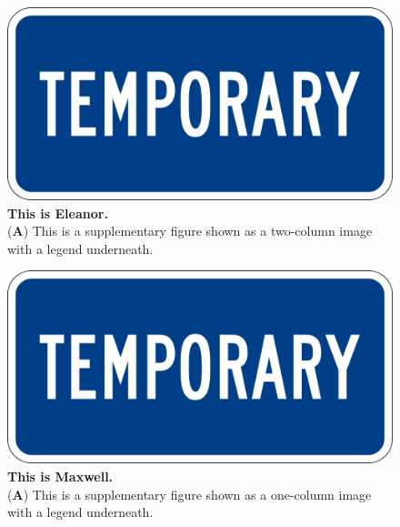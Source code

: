 \documentclass[vruler,JCS]{COB}
\begin{document}


\newcommand{\newblock}{}




\clearpage

\setcounter{figure}{0} %
\makeatletter 
\renewcommand{\thefigure}{S\@arabic\c@figure} %
\makeatother


\begin{figure}
\centering
\includegraphics[width=0.75\linewidth]{Figures/temp.png}
\caption{\textbf{This is Eleanor.}\\
(\textbf{A}) This is a supplementary figure shown as a two-column image with a legend underneath.}
\label{suppfig:eleanor}
\end{figure}

\begin{figure}
\centering
\includegraphics[width=0.75\linewidth]{Figures/temp.png}
\caption{\textbf{This is Maxwell.}\\
(\textbf{A}) This is a supplementary figure shown as a one-column image with a legend underneath.}
\label{suppfig:maxwell}
\end{figure}
\end{document}
